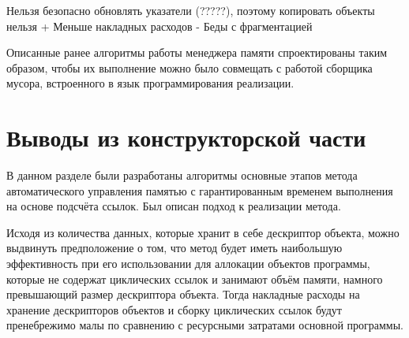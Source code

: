 Нельзя безопасно обновлять указатели (?????), поэтому копировать объекты нельзя
+ Меньше накладных расходов
- Беды с фрагментацией

Описанные ранее алгоритмы работы менеджера памяти спроектированы таким образом, чтобы их выполнение можно было совмещать с работой сборщика мусора, встроенного в язык программирования реализации.



\section*{Выводы из конструкторской части}

В данном разделе были разработаны алгоритмы основные этапов метода автоматического управления памятью с гарантированным временем выполнения на основе подсчёта ссылок. Был описан подход к реализации метода.	

Исходя из количества данных, которые хранит в себе дескриптор объекта, можно выдвинуть предположение о том, что метод будет иметь наибольшую эффективность при его использовании для аллокации объектов программы, которые не содержат циклических ссылок и занимают объём памяти, намного превышающий размер дескриптора объекта. Тогда накладные расходы на хранение дескрипторов объектов и сборку циклических ссылок будут пренебрежимо малы по сравнению с ресурсными затратами основной программы.


